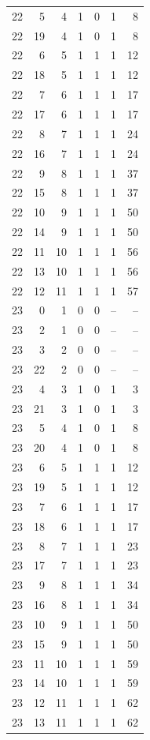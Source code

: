 \begin{longtable}{rrrrrrr}
22 & 5 & 4 & 1 & 0 & 1 & 8\\
22 & 19 & 4 & 1 & 0 & 1 & 8\\
22 & 6 & 5 & 1 & 1 & 1 & 12\\
22 & 18 & 5 & 1 & 1 & 1 & 12\\
22 & 7 & 6 & 1 & 1 & 1 & 17\\
22 & 17 & 6 & 1 & 1 & 1 & 17\\
22 & 8 & 7 & 1 & 1 & 1 & 24\\
22 & 16 & 7 & 1 & 1 & 1 & 24\\
22 & 9 & 8 & 1 & 1 & 1 & 37\\
22 & 15 & 8 & 1 & 1 & 1 & 37\\
22 & 10 & 9 & 1 & 1 & 1 & 50\\
22 & 14 & 9 & 1 & 1 & 1 & 50\\
22 & 11 & 10 & 1 & 1 & 1 & 56\\
22 & 13 & 10 & 1 & 1 & 1 & 56\\
22 & 12 & 11 & 1 & 1 & 1 & 57\\
23 & 0 & 1 & 0 & 0 & -- & --\\
23 & 2 & 1 & 0 & 0 & -- & --\\
23 & 3 & 2 & 0 & 0 & -- & --\\
23 & 22 & 2 & 0 & 0 & -- & --\\
23 & 4 & 3 & 1 & 0 & 1 & 3\\
23 & 21 & 3 & 1 & 0 & 1 & 3\\
23 & 5 & 4 & 1 & 0 & 1 & 8\\
23 & 20 & 4 & 1 & 0 & 1 & 8\\
23 & 6 & 5 & 1 & 1 & 1 & 12\\
23 & 19 & 5 & 1 & 1 & 1 & 12\\
23 & 7 & 6 & 1 & 1 & 1 & 17\\
23 & 18 & 6 & 1 & 1 & 1 & 17\\
23 & 8 & 7 & 1 & 1 & 1 & 23\\
23 & 17 & 7 & 1 & 1 & 1 & 23\\
23 & 9 & 8 & 1 & 1 & 1 & 34\\
23 & 16 & 8 & 1 & 1 & 1 & 34\\
23 & 10 & 9 & 1 & 1 & 1 & 50\\
23 & 15 & 9 & 1 & 1 & 1 & 50\\
23 & 11 & 10 & 1 & 1 & 1 & 59\\
23 & 14 & 10 & 1 & 1 & 1 & 59\\
23 & 12 & 11 & 1 & 1 & 1 & 62\\
23 & 13 & 11 & 1 & 1 & 1 & 62\\

\end{longtable}
